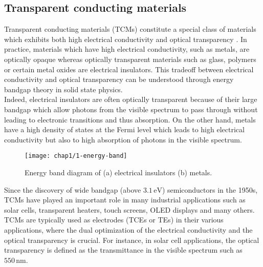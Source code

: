 \subsection{Transparent conducting materials}
    Transparent conducting materials (TCMs) constitute a special class of materials which exhibits both high electrical conductivity and optical transparency \cite{Bardet2021}. In practice, materials which have high electrical conductivity, such as metals, are optically opaque whereas optically transparent materials such as glass, polymers or certain metal oxides are electrical insulators. This tradeoff between electrical conductivity and optical transparency can be understood through energy bandgap theory in solid state physics.\\
    Indeed, electrical insulators are often optically transparent because of their large bandgap 
    which allow photons from the visible spectrum to pass through without leading to electronic transitions and thus absorption. On the other hand, metals have a high density of states at the Fermi level which leads to high electrical conductivity but also to high absorption of photons in the visible spectrum.
    \begin{figure}[H]
        \centering
        \texttt{[image: chap1/1-energy-band]}
        \caption{Energy band diagram of (a) electrical insulators (b) metals.}
        \label{fig:1-bandgap}
    \end{figure}
    Since the discovery of wide bandgap (above $3.1\,\text{eV}$) semiconductors in the 1950s, TCMs have played an important role in many industrial applications such as solar cells, transparent heaters, touch screens, OLED displays and many others. TCMs are typically used as electrodes (TCEs or TEs) in their various applications, where the dual optimization of the electrical conductivity and the optical transparency is crucial. For instance, in solar cell applications, the optical transparency is defined as the transmittance in the visible spectrum such as $550\,\text{nm}$.
